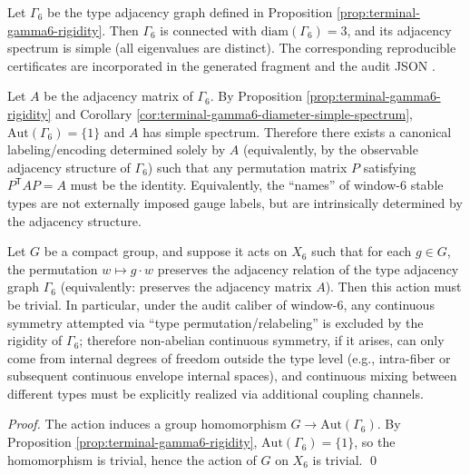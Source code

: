 \begin{corollary}\label{cor:terminal-gamma6-diameter-simple-spectrum}
Let \(\Gamma_6\) be the type adjacency graph defined in Proposition \ref{prop:terminal-gamma6-rigidity}.
Then \(\Gamma_6\) is connected with \(\mathrm{diam}(\Gamma_6)=3\), and its adjacency spectrum is simple (all eigenvalues are distinct).
The corresponding reproducible certificates are incorporated in the generated fragment \texttt{} and the audit JSON \texttt{}.
\end{corollary}

\begin{corollary}\label{cor:terminal-gamma6-canonical-addressing}
Let \(A\) be the adjacency matrix of \(\Gamma_6\).
By Proposition \ref{prop:terminal-gamma6-rigidity} and Corollary \ref{cor:terminal-gamma6-diameter-simple-spectrum},
\(\mathrm{Aut}(\Gamma_6)=\{1\}\) and \(A\) has simple spectrum.
Therefore there exists a canonical labeling/encoding determined solely by \(A\) (equivalently, by the observable adjacency structure of \(\Gamma_6\)) such that any permutation matrix \(P\) satisfying
\(
P^{\mathsf T}AP=A
\)
must be the identity.
Equivalently, the ``names'' of window-\(6\) stable types are not externally imposed gauge labels, but are intrinsically determined by the adjacency structure.
\end{corollary}

\begin{corollary}\label{cor:terminal-gamma6-no-continuous-nonabelian-symmetry}
Let \(G\) be a compact group, and suppose it acts on \(X_6\) such that for each \(g\in G\), the permutation \(w\mapsto g\cdot w\) preserves the adjacency relation of the type adjacency graph \(\Gamma_6\) (equivalently: preserves the adjacency matrix \(A\)).
Then this action must be trivial.
In particular, under the audit caliber of window-\(6\), any continuous symmetry attempted via ``type permutation/relabeling'' is excluded by the rigidity of \(\Gamma_6\);
therefore non-abelian continuous symmetry, if it arises, can only come from internal degrees of freedom outside the type level (e.g., intra-fiber or subsequent continuous envelope internal spaces), and continuous mixing between different types must be explicitly realized via additional coupling channels.
\end{corollary}
\begin{proof}
The action induces a group homomorphism \(G\to \mathrm{Aut}(\Gamma_6)\).
By Proposition \ref{prop:terminal-gamma6-rigidity}, \(\mathrm{Aut}(\Gamma_6)=\{1\}\), so the homomorphism is trivial, hence the action of \(G\) on \(X_6\) is trivial. \qed
\end{proof}

